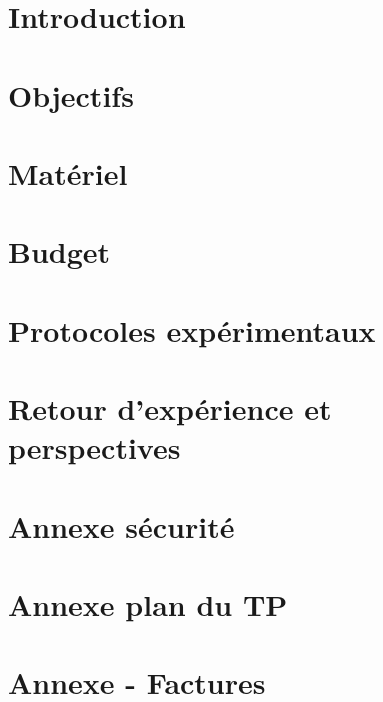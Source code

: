 \documentclass{article}
\begin{document}


\tableofcontents

\newpage

\section{{Introduction}}


\section{{Objectifs}}


\section{{Matériel}}


\section{{Budget}}


\section{{Protocoles expérimentaux}}


\section{{Retour d'expérience et perspectives}}


\newpage

\appendix

\section{{Annexe sécurité}}


\section{Annexe plan du TP}


\section{Annexe - Factures}


\newpage



\end{document}
